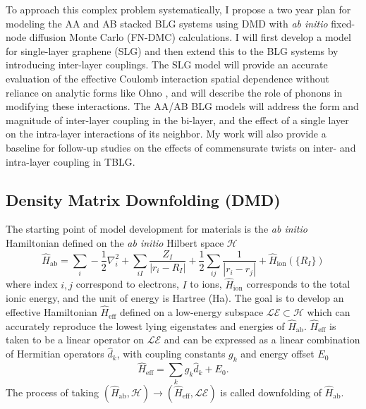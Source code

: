 \documentclass[12pt]{article}
\begin{document}
To approach this complex problem systematically, I propose a two year plan for modeling the AA and AB stacked BLG systems using DMD with \textit{ab initio} fixed-node diffusion Monte Carlo (FN-DMC) calculations.
I will first develop a model for single-layer graphene (SLG) and then extend this to the BLG systems by introducing inter-layer couplings.
The SLG model will provide an accurate evaluation of the effective Coulomb interaction spatial dependence without reliance on analytic forms like Ohno \cite{Ohno1964}, and will describe the role of phonons in modifying these interactions. 
The AA/AB BLG models will address the form and magnitude of inter-layer coupling in the bi-layer, and the effect of a single layer on the intra-layer interactions of its neighbor.
My work will also provide a baseline for follow-up studies on the effects of commensurate twists on inter- and intra-layer coupling in TBLG.

\subsection{Density Matrix Downfolding (DMD)}
The starting point of model development for materials is the \textit{ab initio} Hamiltonian defined on the \textit{ab initio} Hilbert space $\mathcal{H}$
\begin{equation}
\hat{H}_\text{ab} = \sum_i -\frac{1}{2} \nabla_i^2 + \sum_{iI}\frac{Z_I}{|r_i - R_I|} + \frac{1}{2} \sum_{ij} \frac{1}{|r_i - r_j|} + \hat{H}_\text{ion}(\{R_I\})  
\label{eq:Hab}
\end{equation}
where index $i,j$ correspond to electrons, $I$ to ions, $\hat{H}_\text{ion}$ corresponds to the total ionic energy, and the unit of energy is Hartree (Ha).
The goal is to develop an effective Hamiltonian $\hat{H}_\text{eff}$ defined on a low-energy subspace $\mathcal{LE} \subset \mathcal{H}$ which can accurately reproduce the lowest lying eigenstates and energies of $\hat{H}_\text{ab}$.
$\hat{H}_\text{eff}$ is taken to be a linear operator on $\mathcal{LE}$ and can be expressed as a linear combination of Hermitian operators $\hat{d}_k$, with coupling constants $g_k$ and energy offset $E_0$
\begin{equation}
\hat{H}_\text{eff} = \sum_{k} g_k \hat{d}_k  + E_0.
\label{eq:Heff}
\end{equation}
The process of taking $(\hat{H}_\text{ab}, \mathcal{H}) \rightarrow (\hat{H}_\text{eff}, \mathcal{LE})$ is called downfolding of $\hat{H}_\text{ab}$.
\end{document}
